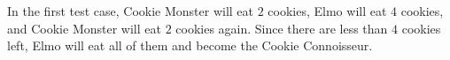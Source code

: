 In the first test case, Cookie Monster will eat $2$ cookies, Elmo will eat $4$ cookies, and Cookie Monster will eat $2$ cookies again. Since there are less than $4$ cookies left, Elmo will eat all of them and become the Cookie Connoisseur.
